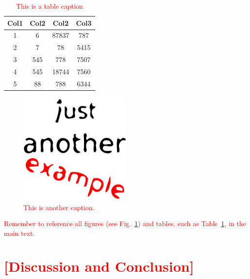 \documentclass[aps,pra,a4paper,nofootinbib,onecolumn,tightenlines,longbibliography,12pt,amsfonts,amssymb,amsmath,floatfix]{revtex4-2} %
\begin{document}
\begin{table}[h] %
\begin{center}
 \begin{tabular}{||c | c c c||} 
 \hline
 Col1 & Col2 & Col2 & Col3 \\ [0.5ex] 
 \hline\hline
 1 & 6 & 87837 & 787 \\ 
 \hline
 2 & 7 & 78 & 5415 \\
 \hline
 3 & 545 & 778 & 7507 \\
 \hline
 4 & 545 & 18744 & 7560 \\
 \hline
 5 & 88 & 788 & 6344\\
 \hline
\end{tabular}
\end{center}
\caption[\textcolor{red}{Short Table Caption}]{%
\label{table:example1} %
\textcolor{red}{This is a table caption}}
\end{table}

\begin{figure}[b]
\includegraphics[width=0.5\textwidth]{example.png}
\caption[\textcolor{red}{Another Short Caption}]{\label{fig:example2} \textcolor{red}{This is another caption.}}
\end{figure}

\textcolor{red}{Remember to reference all figures (see Fig.~\ref{fig:example2}) and tables, such as Table~\ref{table:example1}, in the main text.}

\blindtext[3] %

\newpage
\section{\textcolor{red}{[Discussion and Conclusion]}}
\end{document}
